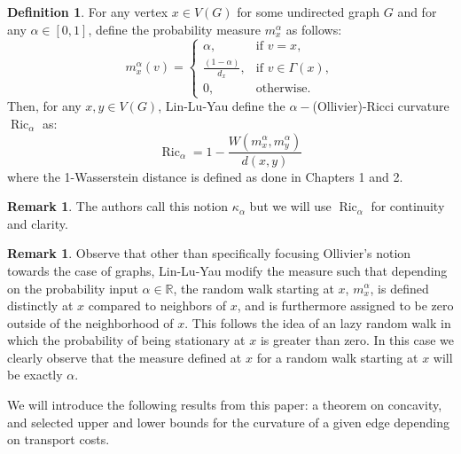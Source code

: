 \documentclass{Dissertate}
\theoremstyle{definition}
\theoremstyle{definition} %
\theoremstyle{definition}
\newtheorem{definition}[theorem]{Definition}
\newtheorem{remark}[theorem]{Remark}
\begin{document}
\begin{definition} For any vertex $x \in V(G)$ for some undirected graph $G$ and for any $\alpha \in [0,1]$, define the probability measure $m_x^\alpha$ as follows: 
\[
m_x^{\alpha}(v) =
\begin{cases}
\alpha, & \text{if } v = x, \\
\frac{(1 - \alpha)}{d_x}, & \text{if } v \in \Gamma(x), \\
0, & \text{otherwise}.
\end{cases}
\]
Then, for any $x,y \in V(G)$, Lin-Lu-Yau define the $\alpha-$(Ollivier)-Ricci curvature $\operatorname{Ric}_\alpha$ as: 
$$
\operatorname{Ric}_\alpha = 1 - \frac{W(m_x^\alpha, m_y^\alpha)}{d(x,y)}
$$
where the 1-Wasserstein distance is defined as done in Chapters 1 and 2.  
\end{definition}
\begin{remark}
The authors call this notion $\kappa_\alpha$ but we will use $\operatorname{Ric}_\alpha$ for continuity and clarity.
\end{remark}
\begin{remark}
Observe that other than specifically focusing Ollivier's notion towards the case of graphs, Lin-Lu-Yau modify the measure such that depending on the probability input $\alpha \in \mathbb{R}$, the random walk starting at $x$, $m_x^\alpha$, is defined distinctly at $x$ compared to neighbors of $x$, and is furthermore assigned to be zero outside of the neighborhood of $x$. This follows the idea of an  lazy random walk in which the probability of being stationary at $x$ is greater than zero. In this case we clearly observe that the measure defined at $x$ for a random walk starting at $x$ will be exactly $\alpha$. 
\end{remark}
We will introduce the following results from this paper: a theorem on concavity, and selected upper and lower bounds for the curvature of a given edge depending on transport costs. 
\end{document}
